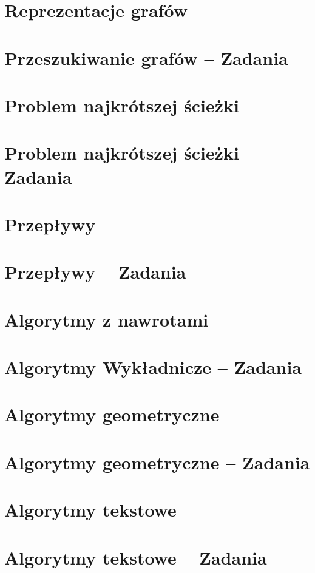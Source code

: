 \section{Reprezentacje grafów}

\section{Przeszukiwanie grafów -- Zadania}

\section{Problem najkrótszej ścieżki}

\section{Problem najkrótszej ścieżki -- Zadania}

\section{Przepływy}

\section{Przepływy -- Zadania}

\section{Algorytmy z nawrotami}
\section{Algorytmy Wykładnicze -- Zadania}

\section{Algorytmy geometryczne}

\section{Algorytmy geometryczne -- Zadania}

\section{Algorytmy tekstowe}

\section{Algorytmy tekstowe -- Zadania}



